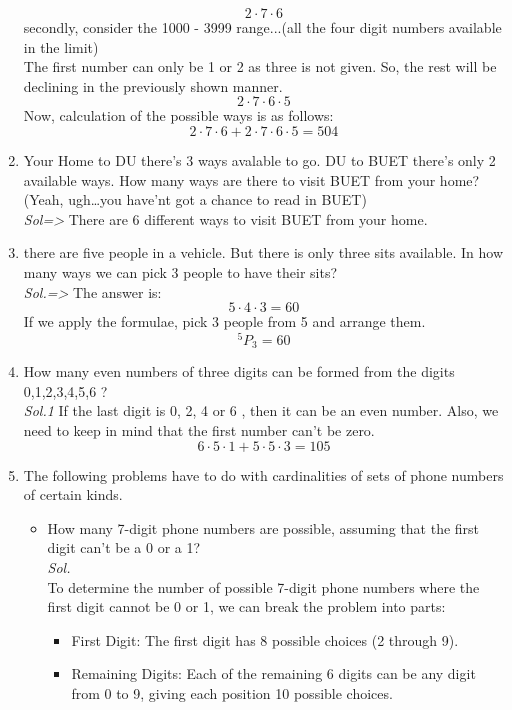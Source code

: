 \documentclass{book}
\begin{document}
\begin{enumerate}
	      \[
		      2 \cdot 7 \cdot 6
	      \]
	      secondly, consider the 1000 - 3999 range...(all the four digit numbers available in the limit)\\
	      The first number can only be 1 or 2 as three  is not given. So, the rest will be declining in the previously shown manner.
	      \[
		      2 \cdot 7\cdot 6\cdot 5
	      \]
	      Now, calculation of the possible ways is as follows:
	      \[
		      2 \cdot 7 \cdot 6 + 2 \cdot 7\cdot 6\cdot 5 = 504
	      \]
	\item Your Home to DU there's 3 ways avalable to go. DU to BUET there's only 2 available ways. How many ways are there to visit BUET from your home?\\
	      (Yeah, ugh\dots you have'nt got a chance to read in BUET)\\
	      \textit{ Sol=> } There are 6 different ways to visit BUET from your home.
	\item there are five people in a vehicle. But there is only three sits available. In how many ways we can pick 3 people to have their sits?\\
	      \textit{ Sol.=> } The answer is:
	      \[
		      5 \cdot 4 \cdot 3 = 60
	      \]
	      If we apply the formulae,
	      pick 3 people from 5 and arrange them.
	      \[
		      ^5P_3 = 60
	      \]
	\item How many even numbers of three digits can be formed from the digits 0,1,2,3,4,5,6 ?\\
	      \textit{ Sol.1} If the last digit is 0, 2, 4 or 6 , then it can be an even number. Also, we need to keep in mind that
	      the first number can't be zero.
	      \[
		      6 \cdot 5 \cdot 1 + 5 \cdot 5 \cdot 3 = 105
	      \]
	\item  The following problems have to do with cardinalities of sets
	      of phone numbers of certain kinds.
	      \begin{itemize}
		      \item How many 7-digit phone numbers are possible, assuming
		            that the first digit can’t be a 0 or a 1?\\
		            \textit{ Sol. }\\
		            To determine the number of possible 7-digit phone numbers where the first digit cannot be 0 or 1, we can break the problem into parts:\\
		            \begin{itemize}
			            \item First Digit: The first digit has 8 possible choices (2 through 9).
			            \item Remaining Digits: Each of the remaining 6 digits can be any digit from 0 to 9, giving each position 10 possible choices.
		            \end{itemize}


\end{itemize}
\end{enumerate}
\end{document}
